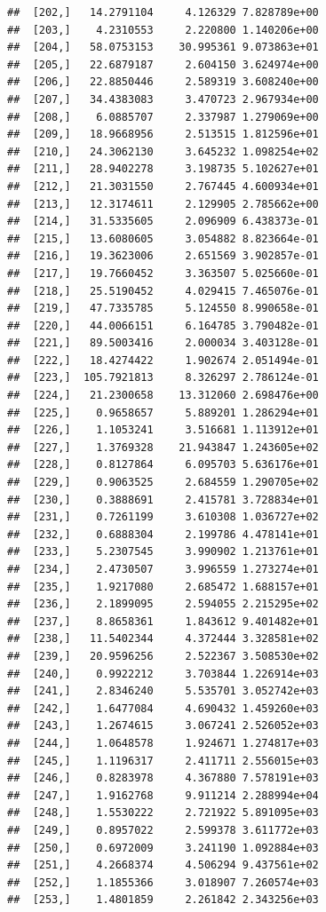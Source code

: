 \documentclass[article]{jss}\usepackage[]{graphicx}\usepackage[]{xcolor}
\makeatletter
\newenvironment{kframe}{%
 \def\at@end@of@kframe{}%
 \ifinner\ifhmode%
  \def\at@end@of@kframe{\end{minipage}}%
  \begin{minipage}{\columnwidth}%
 \fi\fi%
 \def\FrameCommand##1{\hskip\@totalleftmargin \hskip-\fboxsep
 \colorbox{shadecolor}{##1}\hskip-\fboxsep
     \hskip-\linewidth \hskip-\@totalleftmargin \hskip\columnwidth}%
 \MakeFramed {\advance\hsize-\width
   \@totalleftmargin\z@ \linewidth\hsize
   \@setminipage}}%
 {\par\unskip\endMakeFramed%
 \at@end@of@kframe}
\newenvironment{knitrout}{}{} %
\makeatother
\begin{document}
\begin{knitrout}
\begin{kframe}
\begin{verbatim}
##  [202,]   14.2791104     4.126329 7.828789e+00
##  [203,]    4.2310553     2.220800 1.140206e+00
##  [204,]   58.0753153    30.995361 9.073863e+01
##  [205,]   22.6879187     2.604150 3.624974e+00
##  [206,]   22.8850446     2.589319 3.608240e+00
##  [207,]   34.4383083     3.470723 2.967934e+00
##  [208,]    6.0885707     2.337987 1.279069e+00
##  [209,]   18.9668956     2.513515 1.812596e+01
##  [210,]   24.3062130     3.645232 1.098254e+02
##  [211,]   28.9402278     3.198735 5.102627e+01
##  [212,]   21.3031550     2.767445 4.600934e+01
##  [213,]   12.3174611     2.129905 2.785662e+00
##  [214,]   31.5335605     2.096909 6.438373e-01
##  [215,]   13.6080605     3.054882 8.823664e-01
##  [216,]   19.3623006     2.651569 3.902857e-01
##  [217,]   19.7660452     3.363507 5.025660e-01
##  [218,]   25.5190452     4.029415 7.465076e-01
##  [219,]   47.7335785     5.124550 8.990658e-01
##  [220,]   44.0066151     6.164785 3.790482e-01
##  [221,]   89.5003416     2.000034 3.403128e-01
##  [222,]   18.4274422     1.902674 2.051494e-01
##  [223,]  105.7921813     8.326297 2.786124e-01
##  [224,]   21.2300658    13.312060 2.698476e+00
##  [225,]    0.9658657     5.889201 1.286294e+01
##  [226,]    1.1053241     3.516681 1.113912e+01
##  [227,]    1.3769328    21.943847 1.243605e+02
##  [228,]    0.8127864     6.095703 5.636176e+01
##  [229,]    0.9063525     2.684559 1.290705e+02
##  [230,]    0.3888691     2.415781 3.728834e+01
##  [231,]    0.7261199     3.610308 1.036727e+02
##  [232,]    0.6888304     2.199786 4.478141e+01
##  [233,]    5.2307545     3.990902 1.213761e+01
##  [234,]    2.4730507     3.996559 1.273274e+01
##  [235,]    1.9217080     2.685472 1.688157e+01
##  [236,]    2.1899095     2.594055 2.215295e+02
##  [237,]    8.8658361     1.843612 9.401482e+01
##  [238,]   11.5402344     4.372444 3.328581e+02
##  [239,]   20.9596256     2.522367 3.508530e+02
##  [240,]    0.9922212     3.703844 1.226914e+03
##  [241,]    2.8346240     5.535701 3.052742e+03
##  [242,]    1.6477084     4.690432 1.459260e+03
##  [243,]    1.2674615     3.067241 2.526052e+03
##  [244,]    1.0648578     1.924671 1.274817e+03
##  [245,]    1.1196317     2.411711 2.556015e+03
##  [246,]    0.8283978     4.367880 7.578191e+03
##  [247,]    1.9162768     9.911214 2.288994e+04
##  [248,]    1.5530222     2.721922 5.891095e+03
##  [249,]    0.8957022     2.599378 3.611772e+03
##  [250,]    0.6972009     3.241190 1.092884e+03
##  [251,]    4.2668374     4.506294 9.437561e+02
##  [252,]    1.1855366     3.018907 7.260574e+03
##  [253,]    1.4801859     2.261842 2.343256e+03

\end{verbatim}
\end{kframe}
\end{knitrout}
\end{document}
